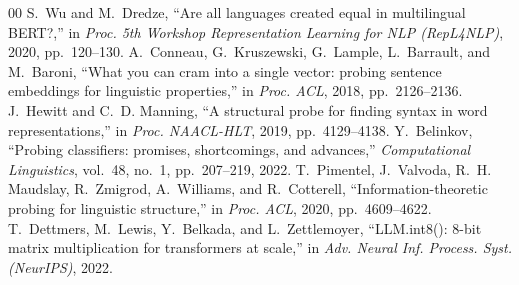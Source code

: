 \documentclass[conference]{IEEEtran}
\begin{document}
\begin{thebibliography}{00}
 S.~Wu and M.~Dredze, ``Are all languages created equal in multilingual BERT?,'' in \emph{Proc. 5th Workshop Representation Learning for NLP (RepL4NLP)}, 2020, pp.~120--130.
 A.~Conneau, G.~Kruszewski, G.~Lample, L.~Barrault, and M.~Baroni, ``What you can cram into a single vector: probing sentence embeddings for linguistic properties,'' in \emph{Proc. ACL}, 2018, pp.~2126--2136.
 J.~Hewitt and C.~D. Manning, ``A structural probe for finding syntax in word representations,'' in \emph{Proc. NAACL-HLT}, 2019, pp.~4129--4138.
 Y.~Belinkov, ``Probing classifiers: promises, shortcomings, and advances,'' \emph{Computational Linguistics}, vol.~48, no.~1, pp.~207--219, 2022.
 T.~Pimentel, J.~Valvoda, R.~H. Maudslay, R.~Zmigrod, A.~Williams, and R.~Cotterell, ``Information-theoretic probing for linguistic structure,'' in \emph{Proc. ACL}, 2020, pp.~4609--4622.
 T.~Dettmers, M.~Lewis, Y.~Belkada, and L.~Zettlemoyer, ``LLM.int8(): 8-bit matrix multiplication for transformers at scale,'' in \emph{Adv. Neural Inf. Process. Syst. (NeurIPS)}, 2022.
\end{thebibliography}
\end{document}
